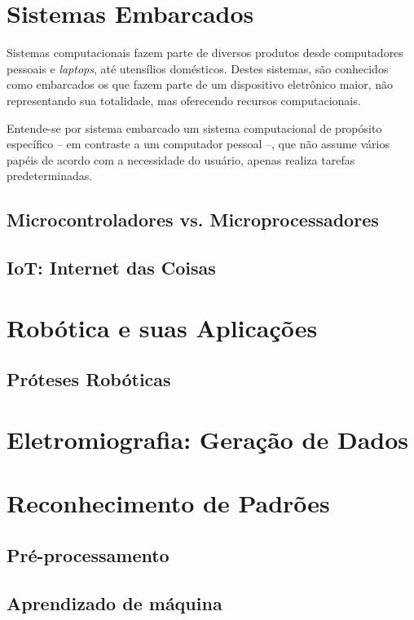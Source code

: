 \section{Sistemas Embarcados}
Sistemas computacionais fazem parte de diversos produtos desde computadores pessoais e \textit{laptops}, até utensílios domésticos. Destes sistemas, são conhecidos como embarcados os que fazem parte de um dispositivo eletrônico maior, não representando sua totalidade, mas oferecendo recursos computacionais. \cite{vahid:2002}

Entende-se por sistema embarcado um sistema computacional de propósito específico -- em contraste a um computador pessoal --, que não assume vários papéis de acordo com a necessidade do usuário, apenas realiza tarefas predeterminadas. \cite{heath:2002}


\subsection{Microcontroladores vs. Microprocessadores}
\subsection{IoT: Internet das Coisas}

\section{Robótica e suas Aplicações}
\subsection{Próteses Robóticas}
\section{Eletromiografia: Geração de Dados}

\section{Reconhecimento de Padrões}
\subsection{Pré-processamento}
\subsection{Aprendizado de máquina}
